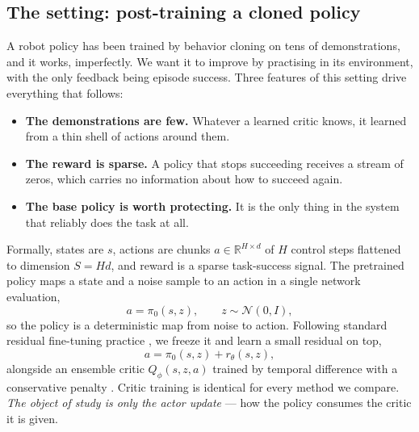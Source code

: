 
\subsection{The setting: post-training a cloned policy}
\label{sec:setup}

A robot policy has been trained by behavior cloning on tens of
demonstrations, and it works, imperfectly. We want it to improve by
practising in its environment, with the only feedback being episode success.
Three features of this setting drive everything that follows:

\begin{itemize}
  \item \textbf{The demonstrations are few.} Whatever a learned critic knows,
  it learned from a thin shell of actions around them.
  \item \textbf{The reward is sparse.} A policy that stops succeeding
  receives a stream of zeros, which carries no information about how to
  succeed again.
  \item \textbf{The base policy is worth protecting.} It is the only thing in
  the system that reliably does the task at all.
\end{itemize}

Formally, states are $s$, actions are chunks $a \in \mathbb{R}^{H\times d}$ of
$H$ control steps flattened to dimension $S = Hd$, and reward is a sparse
task-success signal. The pretrained policy maps a state and a noise sample to
an action in a single network evaluation,
\begin{equation}
  a = \pi_0(s, z), \qquad z \sim \mathcal{N}(0, I),
\end{equation}
so the policy is a deterministic map from noise to action. Following standard
residual fine-tuning practice \citep{dawn2026,dicerl2026}, we freeze it and
learn a small residual on top,
\begin{equation}
  a = \pi_0(s,z) + r_\theta(s,z),
  \label{eq:residual}
\end{equation}
alongside an ensemble critic $Q_\phi(s,z,a)$ trained by temporal difference
with a conservative penalty \citep{kumar2020cql}. Critic training is identical
for every method we compare. \emph{The object of study is only the actor
update} --- how the policy consumes the critic it is given.


